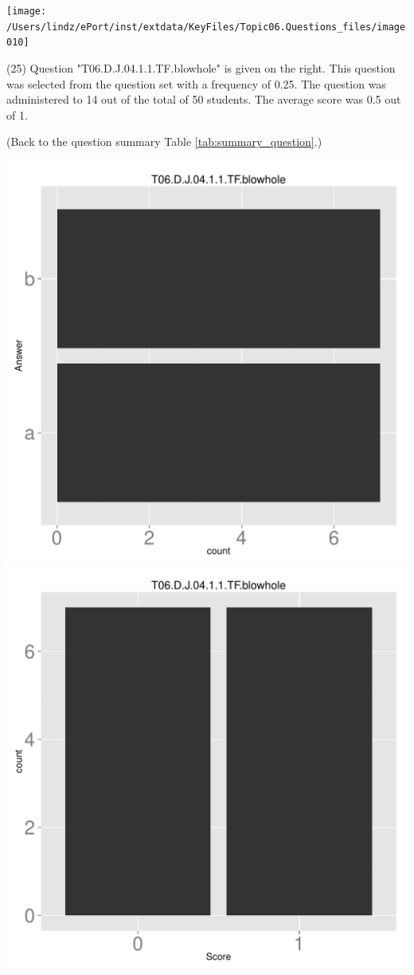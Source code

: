 \documentclass[12pt,english,nohyper]{tufte-handout}\usepackage[]{graphicx}\usepackage[]{color}
\begin{document}
\vspace{6cm}\begin{marginfigure}\texttt{[image: /Users/lindz/ePort/inst/extdata/KeyFiles/Topic06.Questions\_files/image010]}\end{marginfigure}\vspace{-6cm} (25) Question "T06.D.J.04.1.1.TF.blowhole" is given on the right. This question was selected from the question set with a frequency of 0.25. The question was administered to 14 out of the total of 50 students. The average score was 0.5 out of 1.

 (Back to the question summary Table \ref{tab:summary_question}.)

\begin{center} \includegraphics[width=.45\linewidth]{Topic06_AB_25_answer} \includegraphics[width=.45\linewidth]{Topic06_AB_25_score} \end{center} 
\end{document}
